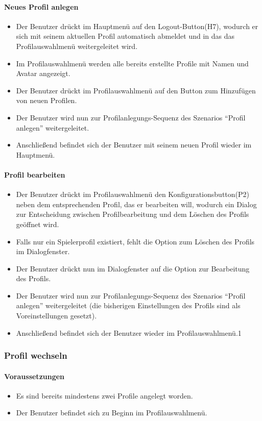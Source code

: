 \paragraph{Neues Profil anlegen}
\begin{itemize}
	\item Der Benutzer drückt im Hauptmenü auf den Logout-Button(H7), wodurch er sich mit seinem aktuellen Profil automatisch abmeldet und in das das Profilauswahlmenü weitergeleitet wird.
	\item Im Profilauswahlmenü werden alle bereits erstellte Profile mit Namen und Avatar angezeigt.
	\item Der Benutzer drückt im Profilauswahlmenü auf den Button zum Hinzufügen von neuen Profilen.
	\item Der Benutzer wird nun zur Profilanlegungs-Sequenz des Szenarios "`Profil anlegen"' weitergeleitet.
	\item Anschließend befindet sich der Benutzer mit seinem neuen Profil wieder im Hauptmenü.
\end{itemize}
\paragraph{Profil bearbeiten }
\begin{itemize}
	\item Der Benutzer drückt im Profilauswahlmenü den Konfigurationsbutton(P2) neben dem entsprechenden Profil, das er bearbeiten will, wodurch ein Dialog zur Entscheidung zwischen Profilbearbeitung und dem Löschen des Profils geöffnet wird.
	\item Falls nur ein Spielerprofil existiert, fehlt die Option zum Löschen des Profils im Dialogfenster.
	\item Der Benutzer drückt nun im Dialogfenster auf die Option zur Bearbeitung des Profils. 
	\item Der Benutzer wird nun zur Profilanlegungs-Sequenz des Szenarios "`Profil anlegen"' weitergeleitet (die bisherigen Einstellungen des Profils sind als Voreinstellungen gesetzt).
	\item Anschließend befindet sich der Benutzer wieder im Profilauswahlmenü.1
\end{itemize}

\subsubsection{Profil wechseln}
\paragraph{Voraussetzungen}
\begin{itemize}
	\item Es sind bereits mindestens zwei Profile angelegt worden.
	\item Der Benutzer befindet sich zu Beginn im Profilauswahlmenü.
\end{itemize}
